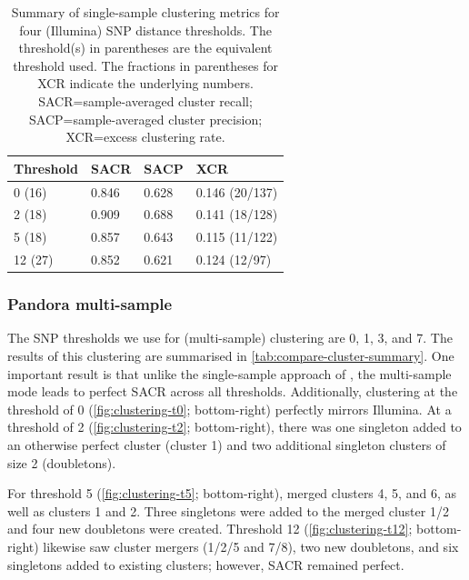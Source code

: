 \begin{table}
\centering
\begin{tabular}{@{}llll@{}}
\toprule
Threshold & SACR  & SACP  & XCR            \\ \midrule
0 (16)    & 0.846 & 0.628 & 0.146 (20/137) \\
2 (18)    & 0.909 & 0.688 & 0.141 (18/128) \\
5 (18)    & 0.857 & 0.643 & 0.115 (11/122) \\
12 (27)   & 0.852 & 0.621 & 0.124 (12/97)  \\ \bottomrule
\end{tabular}
\caption{Summary of \pandora{} single-sample clustering metrics for four (Illumina) SNP distance thresholds. The threshold(s) in parentheses are the \ont{} equivalent threshold used. The fractions in parentheses for XCR indicate the underlying numbers. SACR=sample-averaged cluster recall; SACP=sample-averaged cluster precision; XCR=excess clustering rate.}
\label{tab:map-cluster-summary}
\end{table}

\subsubsection{Pandora multi-sample}

The SNP thresholds we use for \compare{} (multi-sample) clustering are 0, 1, 3, and 7. The results of this clustering are summarised in \autoref{tab:compare-cluster-summary}. One important result is that unlike the single-sample approach of \pandora{}, the multi-sample mode leads to perfect SACR across all thresholds. Additionally, clustering at the threshold of 0 (\autoref{fig:clustering-t0}; bottom-right) perfectly mirrors Illumina. At a threshold of 2 (\autoref{fig:clustering-t2}; bottom-right), there was one singleton added to an otherwise perfect cluster (cluster 1) and two additional singleton clusters of size 2 (doubletons). 

For threshold 5 (\autoref{fig:clustering-t5}; bottom-right), \compare{} merged clusters 4, 5, and 6, as well as clusters 1 and 2. Three singletons were added to the merged cluster 1/2 and four new doubletons were created. Threshold 12 (\autoref{fig:clustering-t12}; bottom-right) likewise saw cluster mergers (1/2/5 and 7/8), two new doubletons, and six singletons added to existing clusters; however, SACR remained perfect.

